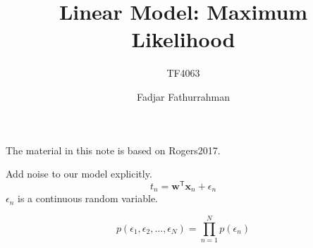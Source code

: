 



\title{Linear Model: Maximum Likelihood}
\subtitle{TF4063}
\author{Fadjar Fathurrahman}
\date{}


\frame{\titlepage}

\begin{frame} %
The material in this note is based on Rogers2017.
\end{frame} %


\begin{frame}

Add noise to our model explicitly.
\begin{equation*}
t_{n} = \mathbf{w}^{\mathsf{T}}\mathbf{x}_{n} + \epsilon_{n}
\end{equation*}
$\epsilon_{n}$ is a continuous random variable.

\begin{equation}
p(\epsilon_{1},\epsilon_{2},\ldots,\epsilon_{N}) = \prod_{n=1}^{N} p(\epsilon_{n})
\end{equation}

\end{frame}



